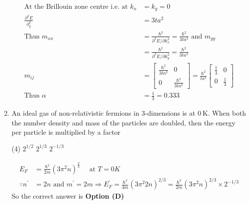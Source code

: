 \begin{enumerate}
\begin{answer}
\begin{align*}
		\text{At the Brillouin zone centre i.e. at }k_{x}&=k_{y}=0\\
		\frac{\partial^{2} E}{\partial_{y}^{2}}&=3 t a^{2}\\
		\text{Thus }m_{x x}&=\frac{\hbar^{2}}{\partial^{2} E / \partial k_{x}^{2}}=\frac{\hbar^{2}}{3 t a^{2}}\text{ and }m_{y y}\\&=\frac{\hbar^{2}}{\partial^{2} E / \partial k_{y}^{2}}=\frac{\hbar^{2}}{3 t a^{2}}\\
		m_{i j}&=\left[\begin{array}{cc}\frac{\hbar^{2}}{3 t a^{2}} & 0 \\ 0 & \frac{\hbar^{2}}{3 t a^{2}}\end{array}\right]=\frac{\hbar^{2}}{t a^{2}}\left[\begin{array}{cc}\frac{1}{3} & 0 \\ 0 & \frac{1}{3}\end{array}\right]\\
		\text{Thus }\alpha&=\frac{1}{3}=0.333
		\end{align*}
	\end{answer}
	\item An ideal gas of non-relativistic fermions in 3-dimensions is at $0 \mathrm{~K}$. When both the number density and mass of the particles are doubled, then the energy per particle is multiplied by a factor
	{}
	\begin{tasks}(4)
		\task[\textbf{A.}]  $2^{1 / 2}$
		\task[\textbf{C.}]  $2^{1 / 3}$
		\task[\textbf{D.}] $2^{-1 / 3}$
	\end{tasks}
	\begin{answer}
		\begin{align*}
		E_{F}&=\frac{\hbar^{2}}{2 m}\left(3 \pi^{2} n\right)^{\frac{2}{3}} \quad\text{ at }T=0 K\\
		\because n^{\prime}&=2 n\text{ and }m^{\prime}=2 m \Rightarrow E_{F}^{\prime}=\frac{\hbar^{2}}{4 m}\left(3 \pi^{2} 2 n\right)^{2 / 3}=\frac{\hbar^{2}}{2 m}\left(3 \pi^{2} n\right)^{2 / 3} \times 2^{-1 / 3}
		\end{align*}
		So the correct answer is \textbf{Option (D)}
	\end{answer}
\end{enumerate}
\setlength\arrayrulewidth{1pt}
